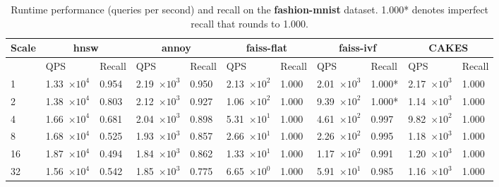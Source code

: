 \begin{table}[!t]
    \caption{Runtime performance (queries per second) and recall on the \textbf{fashion-mnist} dataset. 1.000* denotes imperfect recall that rounds to 1.000.}
    \label{table:results:ann-fashion}
    \vskip 0.15in
    \begin{center}
        \begin{small}
            \begin{sc}
                \begin{tabular}{|l|p{1.2cm}|p{0.8cm}|p{1.2cm}|p{0.8cm}|p{1.2cm}|p{0.8cm}|p{1.2cm}|p{0.8cm}|p{1.2cm}|p{0.8cm}|}
                    \hline
                    \textbf{Scale}  & \multicolumn{2}{|c|}{\textbf{hnsw}} & \multicolumn{2}{|c|}{\textbf{annoy}} & \multicolumn{2}{|c|}{\textbf{faiss-flat}} & \multicolumn{2}{|c|}{\textbf{faiss-ivf}}  & \multicolumn{2}{|c|}{\textbf{CAKES}} \\
                    \hline
                    &             QPS & Recall        & QPS & Recall      & QPS & Recall       & QPS & Recall     & QPS & Recall    \\
                    \hline
                    1   & 1.33~$\times10^{4}$ & 0.954 & 2.19~$\times10^{3}$ & 0.950 & 2.13~$\times10^{2}$  & 1.000 & 2.01~$\times10^{3}$ & 1.000* & 2.17~$\times10^{3}$ & 1.000 \\
                    \hline
                    2   & 1.38~$\times10^{4}$ & 0.803 & 2.12~$\times10^{3}$ & 0.927 & 1.06~$\times10^{2}$  & 1.000 & 9.39~$\times10^{2}$ & 1.000* & 1.14~$\times10^{3}$ & 1.000 \\
                    \hline
                    4   & 1.66~$\times10^{4}$ & 0.681 & 2.04~$\times10^{3}$ & 0.898 & 5.31~$\times10^{1}$  & 1.000 & 4.61~$\times10^{2}$ & 0.997  & 9.82~$\times10^{2}$ & 1.000 \\
                    \hline
                    8   & 1.68~$\times10^{4}$ & 0.525 & 1.93~$\times10^{3}$ & 0.857 & 2.66~$\times10^{1}$  & 1.000 & 2.26~$\times10^{2}$ & 0.995  & 1.18~$\times10^{3}$ & 1.000 \\
                    \hline
                    16  & 1.87~$\times10^{4}$ & 0.494 & 1.84~$\times10^{3}$ & 0.862 & 1.33~$\times10^{1}$  & 1.000 & 1.17~$\times10^{2}$ & 0.991  & 1.20~$\times10^{3}$ & 1.000 \\
                    \hline
                    32  & 1.56~$\times10^{4}$ & 0.542 & 1.85~$\times10^{3}$ & 0.775 & 6.65~$\times10^{0}$  & 1.000 & 5.91~$\times10^{1}$ & 0.985  & 1.16~$\times10^{3}$ & 1.000 \\

\end{tabular}
\end{sc}
\end{small}
\end{center}
\end{table}
